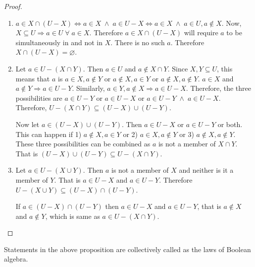 \begin{proof}
\begin{enumerate}
\item $a \in X \cap (U - X) \Leftrightarrow a \in X \;\land\; a \in U - X
\Leftrightarrow a \in X \;\land\; a \in U, a \notin X$. Now, $X \subseteq
U \Rightarrow a \in U \;\forall\; a \in X$. Therefore $a \in X \cap (U - X)
$ will require $a$ to be simultaneously in and not in $X$. There is no such
$a$. Therefore $X \cap (U - X) = \varnothing$.

\item Let $a \in U - (X \cap Y)$. Then $a \in U$ and $a \notin X \cap Y$.
Since $X, Y \subseteq U$, this means that $a$ is $a \in X, a \notin Y$ or
$a \notin X, a \in Y$ or $a \notin X, a \notin Y$. $a \in X$ and $a \notin
Y \Rightarrow a \in U - Y$. Similarly, $a \in Y, a \notin X \Rightarrow
a \in U - X$. Therefore, the three possibilities are $a \in U - Y$ or $a
\in U - X$ or $a \in U - Y \;\land\; a \in U - X$. Therefore, $U - (X \cap
Y) \subseteq (U - X) \cup (U - Y)$.

Now let $a \in (U - X) \cup (U - Y)$. Then $a \in U - X$ or $a \in U - Y$ 
or both. This can happen if 1) $a \notin X, a \in Y$ or 2) $a \in X, a 
\notin Y$ or 3) $a \notin X, a \notin Y$. These three possibilities can
be combined as $a$ is not a member of $X \cap Y$. That is $(U - X) \cup
(U - Y) \subseteq U - (X \cap Y)$.

\item Let $a \in U - (X \cup Y)$. Then $a$ is not a member of $X$ and
neither is it a member of $Y$. That is $a \in U - X$ and $a \in U - Y$. 
Therefore $U - (X \cup Y) \subseteq (U - X) \cap (U - Y)$.

If $a \in (U - X) \cap (U - Y)$ then $a \in U - X$ and $a \in U - Y$, that
is $a \notin X$ and $a \notin Y$, which is same as $a \in U - (X \cap Y)$.
\end{enumerate}
\end{proof}

Statements in the above proposition are collectively called as the laws
of Boolean algebra.

